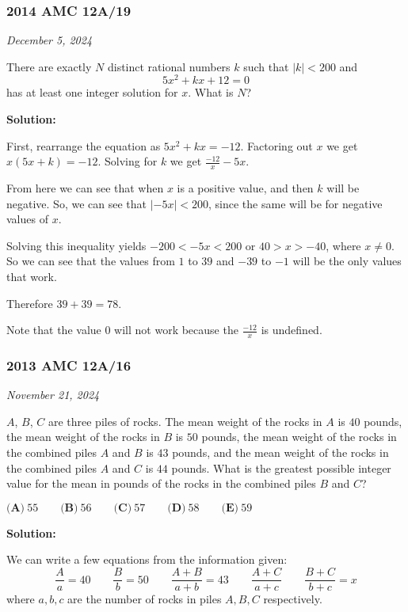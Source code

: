 \documentclass[../mathproblems.tex]{subfiles}
\begin{document}
\noindent\hrulefill

\subsubsection*{2014 AMC 12A/19}
\textit{December 5, 2024}

There are exactly $N$ distinct rational numbers $k$ such that $|k|<200$ and \[5x^2+kx+12=0\] has at least one integer solution for $x$. What is $N$? 

\textbf{Solution:}

First, rearrange the equation as $5x^2+kx=-12$. Factoring out $x$ we get $x(5x+k)=-12$. Solving for $k$ we get $\frac{-12}{x}-5x$.

From here we can see that when $x$ is a positive value, and then $k$ will be negative. So, we can see that $|-5x|<200$, since the same will be for negative values of $x$.

Solving this inequality yields $-200<-5x<200$ or $40>x>-40$, where $x\neq 0$. So we can see that the values from $1$ to $39$ and $-39$ to $-1$ will be the only values that work.

Therefore $39+39=\boxed{78}$.

Note that the value $0$ will not work because the $\frac{-12}{x}$ is undefined. 

\noindent\hrulefill
\subsubsection*{2013 AMC 12A/16} 
\textit{November 21, 2024}

$A$, $B$, $C$ are three piles of rocks. The mean weight of the rocks in $A$ is $40$ pounds, the mean weight of the rocks in $B$ is $50$ pounds, the mean weight of the rocks in the combined piles $A$ and $B$ is $43$ pounds, and the mean weight of the rocks in the combined piles $A$ and $C$ is $44$ pounds. What is the greatest possible integer value for the mean in pounds of the rocks in the combined piles $B$ and $C$?

$\textbf{(A)} \ 55 \qquad \textbf{(B)} \ 56 \qquad \textbf{(C)} \ 57 \qquad \textbf{(D)} \ 58 \qquad \textbf{(E)} \ 59$

\textbf{Solution:}

We can write a few equations from the information given:
\[\frac{A}{a}=40 \qquad \frac{B}{b} = 50 \qquad \frac{A+B}{a+b} = 43 \qquad \frac{A+C}{a+c} \qquad \frac{B+C}{b+c} = x\]where $a,b,c$ are the number of rocks in piles $A,B,C$ respectively.
\end{document}
